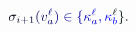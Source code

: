 \documentclass[12pt]{article}
\begin{document}
\makeatletter
\renewcommand*{\@textcolor}[3]{%
  \protect\leavevmode
  \begingroup
    \color#1{#2}#3%
  \endgroup
}
\makeatother
\begin{displaymath}
\mathcolor[RGB]{0,0,15}{\sigma} _ { \mathcolor[RGB]{0,0,30}{i} \mathcolor[RGB]{0,0,45}{+} \mathcolor[RGB]{0,0,60}{1} } \mathcolor[RGB]{0,0,75}{(} \mathcolor[RGB]{0,0,90}{v} _ { \mathcolor[RGB]{0,0,105}{a} } ^ { \mathcolor[RGB]{0,0,120}{\ell} } \mathcolor[RGB]{0,0,135}{)} \mathcolor[RGB]{0,0,150}{\in} \mathcolor[RGB]{0,0,165}{\{} \mathcolor[RGB]{0,0,180}{\kappa} _ { \mathcolor[RGB]{0,0,195}{a} } ^ { \mathcolor[RGB]{0,0,210}{\ell} } \mathcolor[RGB]{0,0,225}{,} \mathcolor[RGB]{0,0,240}{\kappa} _ { \mathcolor[RGB]{0,0,255}{b} } ^ { \mathcolor[RGB]{0,15,0}{\ell} } \mathcolor[RGB]{0,15,15}{\}} \mathcolor[RGB]{0,15,30}{.}
\end{displaymath}
\end{document}
